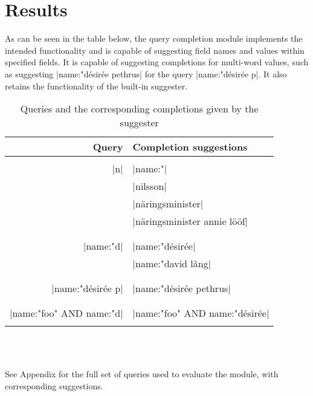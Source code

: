 \section{Results}\label{results}

As can be seen in the table below, the query completion module implements the intended functionality and is capable of suggesting field names and values within specified fields. It is capable of suggesting completions for multi-word values, such as suggesting |name:"désirée pethrus| for the query |name:"désirée p|. It also retains the functionality of the built-in suggester.\\


\begin{table}[h!]
\begin{tabular}{ r | l}
    Query & Completion suggestions \\    
    \hline                    
    & \\
  |n| & |name:"| \\
      & |nilsson| \\
      & |näringsminister| \\
      & |näringsminister annie lööf| \\
      & \\
    \hline
    & \\
      |name:"d| & |name:"désirée| \\
            & |name:"david lång| \\
            & \\
    \hline
    & \\
    |name:"désirée p| & |name:"désirée pethrus| \\
    & \\
    \hline
    & \\
    |name:"foo" AND name:"d| & |name:"foo" AND name:"désirée| \\
    & \\
\end{tabular}\\\\
    \caption{\footnotesize{Queries and the corresponding completions given by the suggester}}
\end{table}

\noindent See Appendix for the full set of queries used to evaluate the module, with corresponding suggestions.